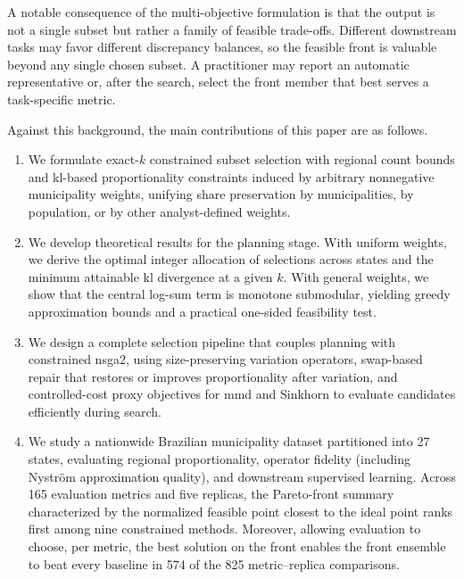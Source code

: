 \documentclass[10pt,journal]{IEEEtran}
\newcommand{\1}{\mathbf{1}}
\theoremstyle{ieeethm}
\begin{document}
A notable consequence of the multi-objective formulation is that the output is not a single subset but rather a family of feasible trade-offs. Different downstream tasks may favor different discrepancy balances, so the feasible front is valuable beyond any single chosen subset. A practitioner may report an automatic representative or, after the search, select the front member that best serves a task-specific metric.

Against this background, the main contributions of this paper are as follows.
\begin{enumerate}[label=(\roman*)]
    \item We formulate exact-$k$ constrained subset selection with regional count bounds and \gls{kl}-based proportionality constraints induced by arbitrary nonnegative municipality weights, unifying share preservation by municipalities, by population, or by other analyst-defined weights.

    \item We develop theoretical results for the planning stage. With uniform weights, we derive the optimal integer allocation of selections across states and the minimum attainable \gls{kl} divergence at a given $k$. With general weights, we show that the central log-sum term is monotone submodular, yielding greedy approximation bounds and a practical one-sided feasibility test.

    \item We design a complete selection pipeline that couples planning with constrained \gls{nsga2}, using size-preserving variation operators, swap-based repair that restores or improves proportionality after variation, and controlled-cost proxy objectives for \gls{mmd} and Sinkhorn to evaluate candidates efficiently during search.

    \item We study a nationwide Brazilian municipality dataset partitioned into 27 states, evaluating regional proportionality, operator fidelity (including Nyström approximation quality), and downstream supervised learning. Across 165 evaluation metrics and five replicas, the Pareto-front summary characterized by the normalized feasible point closest to the ideal point ranks first among nine constrained methods. Moreover, allowing evaluation to choose, per metric, the best solution on the front enables the front ensemble to beat every baseline in 574 of the 825 metric--replica comparisons.
\end{enumerate}
\end{document}

